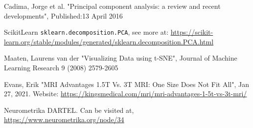 \documentclass[11pt, fleqn, titlepage]{article}
\newcommand{\1}[1]{\mathds{1}\left[#1\right]}
\begin{document}
\begin{thebibliography}{9}
		 Cadima, Jorge et al. "Principal component analysis: a review and recent developments", Published:13 April 2016
		
		 ScikitLearn \texttt{sklearn.decomposition.PCA}, see more at: \url{https://scikit-learn.org/stable/modules/generated/sklearn.decomposition.PCA.html}
		
		 Maaten, Laurens van der "Visualizing Data using t-SNE", Journal of Machine Learning Research 9 (2008) 2579-2605 
		
		 Evans, Erik "MRI Advantages 1.5T Vs. 3T MRI: One Size Does Not Fit All", Jan 27, 2021. Website: \url{https://kingsmedical.com/mri/mri-advantages-1-5t-vs-3t-mri/}
		
		 Neurometrika DARTEL. Can be visited at, \url{https://www.neurometrika.org/node/34}
		
	\end{thebibliography}
	
	
	\newpage
	
	
	
	
	
	
	
	
	
	
	
\end{document}
